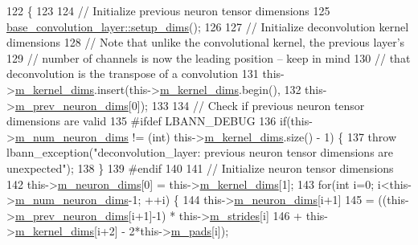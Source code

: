 \begin{DoxyCode}
122                              \{
123 
124     \textcolor{comment}{// Initialize previous neuron tensor dimensions}
125     \hyperlink{classlbann_1_1Layer_a90fce1b06c1f2abb480e18cfe08a9746}{base\_convolution\_layer::setup\_dims}();
126 
127     \textcolor{comment}{// Initialize deconvolution kernel dimensions}
128     \textcolor{comment}{// Note that unlike the convolutional kernel, the previous layer's}
129     \textcolor{comment}{// number of channels is now the leading position -- keep in mind}
130     \textcolor{comment}{// that deconvolution is the transpose of a convolution}
131     this->\hyperlink{classlbann_1_1base__convolution__layer_a283edb6a476f975e713d0b4235ac658f}{m\_kernel\_dims}.insert(this->\hyperlink{classlbann_1_1base__convolution__layer_a283edb6a476f975e713d0b4235ac658f}{m\_kernel\_dims}.begin(),
132                                this->\hyperlink{classlbann_1_1Layer_ae204d1a2a79606eaa117273857ff62a3}{m\_prev\_neuron\_dims}[0]);
133 
134     \textcolor{comment}{// Check if previous neuron tensor dimensions are valid}
135 \textcolor{preprocessor}{  #ifdef LBANN\_DEBUG}
136     \textcolor{keywordflow}{if}(this->\hyperlink{classlbann_1_1Layer_adfd6178d21498c9095cd947ae1eb2d6a}{m\_num\_neuron\_dims} != (\textcolor{keywordtype}{int}) this->\hyperlink{classlbann_1_1base__convolution__layer_a283edb6a476f975e713d0b4235ac658f}{m\_kernel\_dims}.size() - 1) \{
137       \textcolor{keywordflow}{throw} lbann\_exception(\textcolor{stringliteral}{"deconvolution\_layer: previous neuron tensor dimensions are unexpected"});
138     \}
139 \textcolor{preprocessor}{  #endif}
140 
141     \textcolor{comment}{// Initialize neuron tensor dimensions}
142     this->\hyperlink{classlbann_1_1Layer_abb34bb8031f57a483e2e327a5f229f48}{m\_neuron\_dims}[0] = this->\hyperlink{classlbann_1_1base__convolution__layer_a283edb6a476f975e713d0b4235ac658f}{m\_kernel\_dims}[1];
143     \textcolor{keywordflow}{for}(\textcolor{keywordtype}{int} i=0; i<this->\hyperlink{classlbann_1_1Layer_adfd6178d21498c9095cd947ae1eb2d6a}{m\_num\_neuron\_dims}-1; ++i) \{
144       this->\hyperlink{classlbann_1_1Layer_abb34bb8031f57a483e2e327a5f229f48}{m\_neuron\_dims}[i+1]
145         = ((this->\hyperlink{classlbann_1_1Layer_ae204d1a2a79606eaa117273857ff62a3}{m\_prev\_neuron\_dims}[i+1]-1) * this->\hyperlink{classlbann_1_1base__convolution__layer_a2429495822363e41f1f6b96a6b430445}{m\_strides}[i]
146            + this->\hyperlink{classlbann_1_1base__convolution__layer_a283edb6a476f975e713d0b4235ac658f}{m\_kernel\_dims}[i+2] - 2*this->\hyperlink{classlbann_1_1base__convolution__layer_a9732a8a0170a413bf0cde0128ad2a571}{m\_pads}[i]);

\end{DoxyCode}
